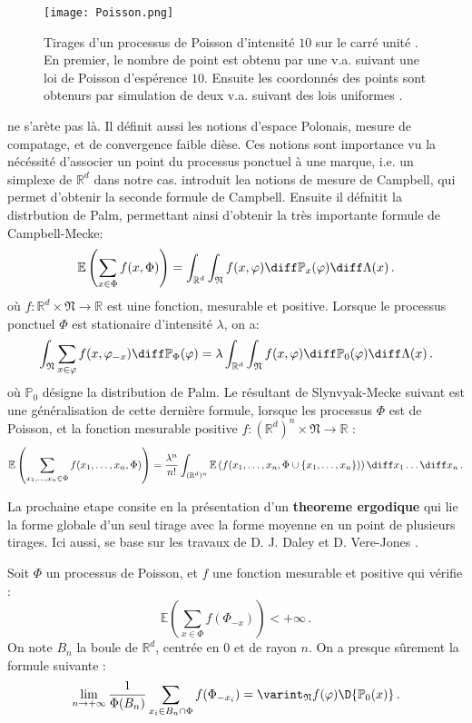 \begin{figure}[H]
    \centering
    \texttt{[image: Poisson.png]}\
    \caption{Tirages d’un processus de Poisson d’intensité $10$ sur le carré unité \parencite[p.137]{balasoiu2020halthesis}. En premier, le nombre de point est obtenu par une v.a. suivant une loi de Poisson d'espérence $10$. Ensuite les coordonnés des points sont obtenurs par simulation de deux v.a. suivant des lois uniformes \parencite{keeler2018simu}.}
    \label{fig:poisson}
\end{figure}

\citeauthor{balasoiu2020halthesis} ne s'arète pas là. Il définit aussi les notions d'espace Polonais, mesure de compatage, et de convergence faible dièse. Ces notions sont importance vu la nécéssité d'associer un point du processus ponctuel à une marque, i.e. un simplexe de $\mathbb{R}^d$ dans notre cas. \citeauthor{balasoiu2020halthesis} introduit lea notions de mesure de Campbell, qui permet d'obtenir la seconde formule de Campbell. Ensuite il défnitit la distrbution de Palm, permettant ainsi d'obtenir la très importante formule de Campbell-Mecke:
\[
\mathbb{E} \left( \sum_{x \in \Phi} f(x,\Phi) \right) = \int_{\mathbb{R}^d} \int_{\mathfrak{N}} f(x,\varphi) \diff
\mathbb{P}_x(\varphi) \diff \Lambda(x) \,.
\]
où $f:\mathbb{R}^d \times \mathfrak{N} \rightarrow \mathbb{R}$ est uine fonction, mesurable et positive. Lorsque le processus ponctuel $\Phi$ est stationaire d'intensité $\lambda$, on a:
\[
 \int_{\mathfrak{N}} \sum_{x \in \varphi} f(x,\varphi_{ - x}) \diff\mathbb{P}_\Phi(\varphi) = \lambda \int_{\mathbb{R}^d} \int_{\mathfrak{N}} f(x,\varphi) \diff
\mathbb{P}_0(\varphi) \diff \Lambda(x) \,.
\]
où $\mathbb{P}_0$ désigne la distribution de Palm. Le résultant de Slynvyak-Mecke suivant est une généralisation de cette dernière formule, lorsque les processus $\Phi$ est de Poisson, et la fonction mesurable positive $f:(\mathbb{R}^d)^n \times \mathfrak{N} \rightarrow \mathbb{R}$ :
\[
\mathbb{E} \left( \sum_{x_1,\ldots,x_n \in \Phi} f(x_1,\ldots,x_n,\Phi) \right) = \frac{\lambda^n}{n!} \int_{(\mathbb{R}^d)^n} \mathbb{E} \left(f(x_1,\ldots,x_n,\Phi \cup \{ x_1,\ldots,x_n \}) \right) \diff x_1 \ldots \diff x_n \,.
\]

La prochaine etape consite en la présentation d'un \textbf{theoreme ergodique} qui lie la forme globale d’un seul tirage avec la forme moyenne en un point de plusieurs tirages. Ici aussi, \citeauthor{balasoiu2020halthesis} se base sur les travaux de D. J. Daley et D. Vere-Jones \parencite{daley2008introduction}.
\begin{theorem} \label{th:slmk}
    Soit $\Phi$ un processus de Poisson, et $f$ une fonction mesurable et positive qui vérifie :
    $$
    \mathbb{E}\left( \sum_{x\in \Phi} f(\Phi_{-x}) \right) < +\infty \,.
    $$
    On note $B_n$ la boule de $\mathbb{R}^d$, centrée en $0$ et de rayon $n$. On a presque sûrement la formule
    suivante :
    $$
    \lim_{n\rightarrow +\infty} \frac{1}{\Phi(B_n)} \sum_{x_i \in B_n \cap \Phi} f(\Phi_{-x_i}) = \varint_{\mathfrak{N}} f(\varphi) \D{\mathbb{P}_0(x)}  \,. 
    $$
\end{theorem}

